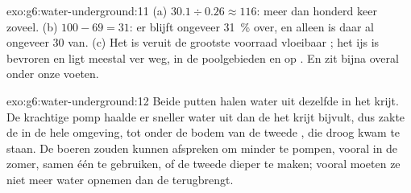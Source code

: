 \begin{solution}{exo:g6:water-underground:11}
(a) $30.1 \div 0.26 \approx 116$: meer dan honderd keer zoveel.
(b) $100 - 69 = 31$: er blijft ongeveer 31~\% over, en  alleen is
daar al ongeveer 30 van. (c) Het is veruit de grootste voorraad vloeibaar
; het ijs is bevroren en ligt meestal ver weg, in de poolgebieden
en op . En  zit bijna overal onder onze voeten.
\end{solution}

\begin{solution}{exo:g6:water-underground:12}
Beide putten halen water uit dezelfde  in het krijt. De
krachtige pomp haalde er sneller water uit dan de  het krijt bijvult,
dus zakte de  in de hele omgeving, tot onder de bodem van
de tweede , die droog kwam te staan. De boeren zouden kunnen afspreken
om minder te pompen, vooral in de zomer, samen één  te gebruiken, of
de tweede  dieper te maken; vooral moeten ze niet meer water opnemen
dan de  terugbrengt.
\end{solution}

